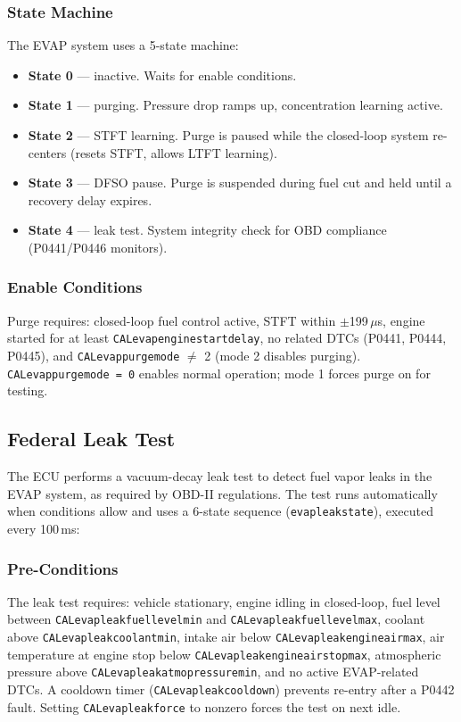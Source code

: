 \documentclass[a4paper,11pt]{article}
\renewcommand{\_}{\oldunderscore\allowbreak}
\begin{document}
\subsubsection*{State Machine}

The EVAP system uses a 5-state machine:
\begin{itemize}
\item \textbf{State 0} --- inactive. Waits for enable conditions.
\item \textbf{State 1} --- purging. Pressure drop ramps up, concentration
      learning active.
\item \textbf{State 2} --- STFT learning. Purge is paused while the
      closed-loop system re-centers (resets STFT, allows LTFT learning).
\item \textbf{State 3} --- DFSO pause. Purge is suspended during fuel cut
      and held until a recovery delay expires.
\item \textbf{State 4} --- leak test. System integrity check for OBD
      compliance (P0441/P0446 monitors).
\end{itemize}

\subsubsection*{Enable Conditions}

Purge requires: closed-loop fuel control active, STFT within $\pm$199\,$\mu$s,
engine started for at least \texttt{CAL\_evap\_engine\_start\_delay}, no
related DTCs (P0441, P0444, P0445), and \texttt{CAL\_evap\_purge\_mode}
$\neq$ 2 (mode 2 disables purging). \texttt{CAL\_evap\_purge\_mode = 0}
enables normal operation; mode 1 forces purge on for testing.

\newpage
\subsection{Federal Leak Test}

The ECU performs a vacuum-decay leak test to detect fuel vapor leaks in the
EVAP system, as required by OBD-II regulations. The test runs automatically
when conditions allow and uses a 6-state sequence
(\texttt{evap\_leak\_state}), executed every 100\,ms:

\subsubsection*{Pre-Conditions}

The leak test requires: vehicle stationary, engine idling in closed-loop, fuel
level between \texttt{CAL\_evap\_leak\_fuel\_level\_min} and
\texttt{CAL\_evap\_leak\_fuel\_level\_max}, coolant above
\texttt{CAL\_evap\_leak\_coolant\_min}, intake air below
\texttt{CAL\_evap\_leak\_engine\_air\_max}, air temperature at engine stop below
\texttt{CAL\_evap\_leak\_engine\_air\_stop\_max}, atmospheric pressure above
\texttt{CAL\_evap\_leak\_atmo\_pressure\_min}, and no active EVAP-related DTCs.
A cooldown timer (\texttt{CAL\_evap\_leak\_cooldown}) prevents re-entry after a
P0442 fault. Setting \texttt{CAL\_evap\_leak\_force} to nonzero forces the test
on next idle.
\end{document}
